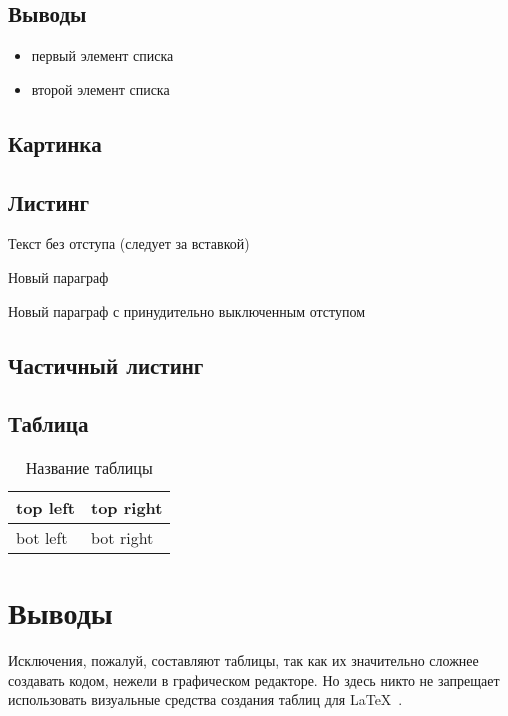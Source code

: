 \subsection{Выводы}

\begin{itemize}
\item первый элемент списка
\item второй элемент списка
\end{itemize}


\subsection{Картинка}



\subsection{Листинг}


\parindent=1cm %
Текст без отступа (следует за вставкой)

Новый параграф

\noindent Новый параграф с принудительно выключенным отступом


\subsection{Частичный листинг}

\subsection{Таблица}

\begin{table}[H]
	\caption{ Название таблицы}
	\begin{center}
		\begin{tabular}{|l|l|}
			\hline
			top left & top right\\ \hline
			bot left & bot right\\ \hline
		\end{tabular}
		\label{tabular:tab_examp}
	\end{center}
\end{table}

\section{Выводы}

Исключения, пожалуй, составляют таблицы, так как их значительно сложнее создавать кодом, нежели в графическом редакторе. Но здесь никто не запрещает использовать визуальные средства создания таблиц для \LaTeX\ .

